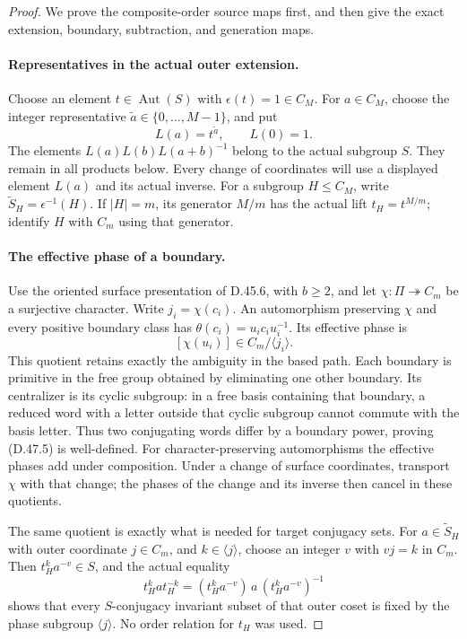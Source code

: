 \begin{proof}
We prove the composite-order source maps first, and then give
the exact extension, boundary, subtraction, and generation maps.

\paragraph{Representatives in the actual outer extension.}
Choose an element \(t\in\operatorname{Aut}(S)\) with
\(\epsilon(t)=1\in C_M\). For \(a\in C_M\), choose the
integer representative \(\widetilde a\in\{0,\ldots,M-1\}\),
and put
\[
                  L(a)=t^{\widetilde a},\qquad L(0)=1.
 \tag{D.47.4}
\]
The elements
\(L(a)L(b)L(a+b)^{-1}\) belong to the actual subgroup \(S\).
They remain in all products below. Every change of coordinates
will use a displayed element \(L(a)\) and its actual inverse.
For a subgroup \(H\leq C_M\), write
\(\widetilde S_H=\epsilon^{-1}(H)\).
If \(|H|=m\), its generator \(M/m\) has the actual lift
\(t_H=t^{M/m}\); identify \(H\) with \(C_m\) using that
generator.

\paragraph{The effective phase of a boundary.}
Use the oriented surface presentation of D.45.6, with
\(b\geq2\), and let \(\chi:\Pi\twoheadrightarrow C_m\)
be a surjective character. Write \(j_i=\chi(c_i)\).
An automorphism preserving \(\chi\) and every positive
boundary class has
\(\theta(c_i)=u_ic_iu_i^{-1}\). Its effective phase is
\[
                 [\chi(u_i)]\in C_m/\langle j_i\rangle.
 \tag{D.47.5}
\]
This quotient retains exactly the ambiguity in the based path.
Each boundary is primitive in the free group obtained by
eliminating one other boundary. Its centralizer is its cyclic
subgroup: in a free basis containing that boundary, a reduced
word with a letter outside that cyclic subgroup cannot commute
with the basis letter. Thus two conjugating words differ by
a boundary power, proving \textup{(D.47.5)} is well-defined.
For character-preserving automorphisms the effective phases
add under composition. Under a change of surface coordinates,
transport \(\chi\) with that change; the phases of the change
and its inverse then cancel in these quotients.

The same quotient is exactly what is needed for target
conjugacy sets. For \(a\in\widetilde S_H\) with outer
coordinate \(j\in C_m\), and \(k\in\langle j\rangle\),
choose an integer \(v\) with \(vj=k\) in \(C_m\).
Then \(t_H^ka^{-v}\in S\), and the actual equality
\[
 t_H^k a t_H^{-k}
     =(t_H^ka^{-v})\,a\,(t_H^ka^{-v})^{-1}
 \tag{D.47.6}
\]
shows that every \(S\)-conjugacy invariant subset of that
outer coset is fixed by the phase subgroup \(\langle j\rangle\).
No order relation for \(t_H\) was used.


\end{proof}
